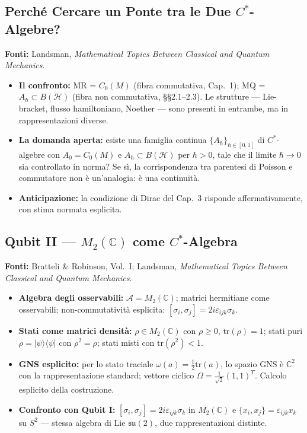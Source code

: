 \documentclass[12pt, a4paper]{article}
\newcommand{\fonti}[1]{%
	\begin{fontebox}
		\textcolor{fontecolor}{\footnotesize\textbf{Fonti:} #1}
	\end{fontebox}%
}
\begin{document}
	\subsection{Perché Cercare un Ponte tra le Due $C^*$-Algebre?}
	
	\fonti{Landsman, \textit{Mathematical Topics Between Classical and Quantum Mechanics}.}
	
	\begin{itemize}
		\item \textbf{Il confronto:} MR = $C_0(M)$ (fibra commutativa, Cap.\ 1); MQ =
		$A_\hbar \subset B(\mathcal{H})$ (fibra non commutativa, §§2.1--2.3). Le strutture
		--- Lie-bracket, flusso hamiltoniano, Noether --- sono presenti in entrambe, ma
		in rappresentazioni diverse.
		\item \textbf{La domanda aperta:} esiste una famiglia continua $\{A_\hbar\}_{\hbar \in [0,1]}$
		di $C^*$-algebre con $A_0 = C_0(M)$ e $A_\hbar \subset B(\mathcal{H})$ per $\hbar > 0$,
		tale che il limite $\hbar \to 0$ sia controllato in norma? Se sì, la corrispondenza
		tra parentesi di Poisson e commutatore non è un'analogia: è una continuità.
		\item \textbf{Anticipazione:} la condizione di Dirac del Cap.\ 3 risponde
		affermativamente, con stima normata esplicita.
	\end{itemize}
	
	\subsection{Qubit II --- $M_2(\mathbb{C})$ come $C^*$-Algebra}
	
	\fonti{Bratteli \& Robinson, Vol.~I; Landsman, \textit{Mathematical Topics Between
			Classical and Quantum Mechanics}.}
	
	\begin{itemize}
		\item \textbf{Algebra degli osservabili:} $\mathcal{A} = M_2(\mathbb{C})$; matrici
		hermitiane come osservabili; non-commutatività esplicita:
		$[\sigma_i, \sigma_j] = 2i\varepsilon_{ijk}\sigma_k$.
		\item \textbf{Stati come matrici densità:} $\rho \in M_2(\mathbb{C})$ con $\rho \geq 0$,
		$\mathrm{tr}(\rho) = 1$; stati puri $\rho = |\psi\rangle\langle\psi|$ con $\rho^2 = \rho$;
		stati misti con $\mathrm{tr}(\rho^2) < 1$.
		\item \textbf{GNS esplicito:} per lo stato traciale $\omega(a) = \frac{1}{2}\mathrm{tr}(a)$,
		lo spazio GNS è $\mathbb{C}^2$ con la rappresentazione standard; vettore ciclico
		$\Omega = \frac{1}{\sqrt{2}}(1, 1)^T$. Calcolo esplicito della costruzione.
		\item \textbf{Confronto con Qubit I:} $[\sigma_i, \sigma_j] = 2i\varepsilon_{ijk}\sigma_k$
		in $M_2(\mathbb{C})$ e $\{x_i, x_j\} = \varepsilon_{ijk}x_k$ su $S^2$ --- stessa
		algebra di Lie $\mathfrak{su}(2)$, due rappresentazioni distinte.
	\end{itemize}
	
\end{document}
